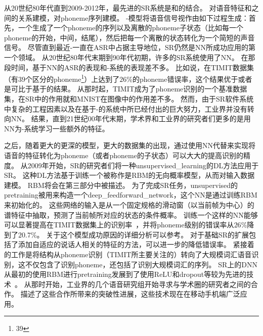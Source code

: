 从20世纪80年代直到2009-2012年，最先进的\gls{SR}系统是和的结合。
对语音特征和之间的关系建模\citep{Bahl87}，对\gls{phoneme}序列建模。
-模型将语音信号视作由如下过程生成：首先，一个生成了一个\gls{phoneme}的序列以及离散的\gls{phoneme}子状态（比如每一个\gls{phoneme}的开始，中间，结尾），然后把每一个离散的状态转化为一个简短的声音信号。
尽管直到最近-一直在\gls{ASR}中占据主导地位，\gls{SR}仍然是\gls{NN}所成功应用的第一个领域。
从20世纪80年代末期到90年代初期，许多的\gls{SR}系统使用了\gls{NN}\citep{Bourlard-cspla89,Waibel89b,Robinson+Fallside91,Bengio91z,Bengio92c,Konig96}。
在那段时间，基于\gls{NN}的\gls{ASR}的表现和-系统的表现差不多。
比如说，\citet{Robinson+Fallside91}在TIMIT数据集\citep{garofolo1993darpa}（有$39$个区分的\gls{phoneme}\footnote{39}）上达到了$26$\%的\gls{phoneme}错误率，这个结果优于或者是可比于基于的结果。
从那时起，TIMIT成为了\gls{phoneme}识别的一个基准数据集，在\gls{SR}中的作用就和MNIST在图像中的作用差不多。
然而，由于\gls{SR}软件系统中复杂的工程因素以及在基于-的系统中所已经付出的巨大努力，工业界并没有转向\gls{NN}。
结果，直到21世纪00年代末期，学术界和工业界的研究者们更多的是用\gls{NN}为-系统学习一些额外的特征。


之后，随着更大的更深的模型，更大的数据集的出现，通过使用\gls{NN}代替来实现将语音的特征转化为\gls{phoneme}（或者\gls{phoneme}的子状态）可以大大的提高识别的精度。
从2009年开始，\gls{SR}的研究者们将一种\gls{unsupervised_learning}的\gls{DL}方法应用于\gls{SR}。
这种\gls{DL}方法基于训练一个被称作是\gls{RBM}的无向概率模型，从而对输入数据建模。
 \gls{RBM}将会在第三部分中被描述。
 为了完成\gls{SR}任务，\gls{unsupervised}的\gls{pretraining}被用来构造一个\gls{deep_feedforward_network}，这个\gls{NN}是通过训练\gls{RBM}来初始化的。
 这些网络的输入是从一个固定规格的滑动窗（以当前帧为中心）的谱特征中抽取，预测了当前帧所对应的状态的条件概率。
 训练一个这样的\gls{NN}能够可以显著提高在TIMIT数据集上的识别率~\citep{mohamed2009deep,Mohamed+Dahl+Hinton-2012}，并将\gls{phoneme}级别的错误率从$26$\%降到了$20.7$\%。
关于这个模型成功原因的详细分析可以参考\citet{mohamed2012understanding}。
 对于基础\gls{SR}的扩展包括了添加自适应的说话人相关的特征\citep{mohamed2011deep}的方法，可以进一步的降低错误率。
 紧接着的工作是将结构从\gls{phoneme}识别（TIMIT所主要关注的）转向了大规模词汇语音识别\citep{Dahl2012}，这不仅包含了识别\gls{phoneme}，还包括了识别大规模词汇的序列。
\gls{SR}上的\gls{DNN}从最初的使用\gls{RBM}进行\gls{pretraining}发展到了使用\gls{ReLU}和\gls{dropout}等较为先进的技术~\citep{Zeiler+al-ICASSP-2013,Dahl-et-al-ICASSP2013}。
从那时开始，工业界的几个语音研究组开始寻求与学术圈的研究者之间的合作。
\citet{Hinton-et-al-2012}描述了这些合作所带来的突破性进展，这些技术现在在移动手机端广泛应用。


